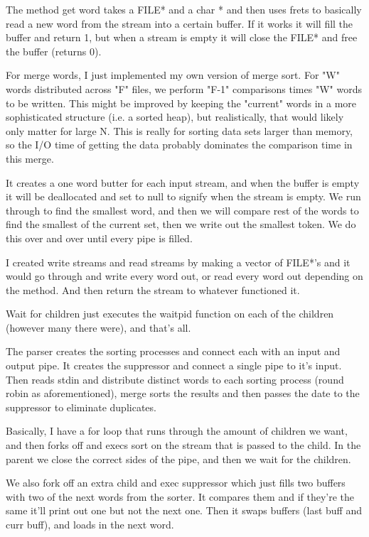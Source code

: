 \documentclass[letterpaper,10pt]{article}
\begin{document}
The method get word takes a FILE* and a char * and then uses frets to basically read a new word from the stream into a certain buffer. If it works it will fill the buffer and return 1, but when a stream is empty it will close the FILE* and free the buffer (returns 0). 

For merge words, I just implemented my own version of merge sort. For "W" words distributed across "F" files, we perform "F-1" comparisons times "W" words to be written. This might be improved by keeping the "current" words in  a more sophisticated structure (i.e. a sorted heap), but realistically, that would likely only matter for large N.  This is really for sorting data sets larger than memory, so the I/O time of getting the data probably dominates the comparison time in this merge.

It creates a one word butter for each input stream, and when the buffer is empty it will be deallocated and set to null to signify when the stream is empty. We run through to find the smallest word, and then we will compare rest of the words to find the smallest of the current set, then we write out the smallest token.  We do this over and over until every pipe is filled.

I created write streams and read streams by making a vector of FILE*'s and it would go through and write every word out, or read every word out depending on the method. And then return the stream to whatever functioned it. 

Wait for children just executes the waitpid function on each of the children (however many there were), and that's all. 

The parser creates the sorting processes and connect each with an input and output pipe. It creates the suppressor and connect a single pipe to it's input. Then reads stdin and distribute distinct words to each sorting process (round robin as aforementioned), merge sorts the results and then passes the date to the suppressor to eliminate duplicates. 

Basically, I have a for loop that runs through the amount of children we want, and then forks off and execs sort on the stream that is passed to the child. In the parent we close the correct sides of the pipe, and then we wait for the children.

 We also fork off an extra child  and exec suppressor which just fills two buffers with two of the next words from the sorter. It compares them and if they're the same it'll print out one but not the next one. Then it swaps buffers (last buff and curr buff), and loads in the next word.
 
\end{document}
